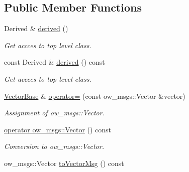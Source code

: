 \subsection*{Public Member Functions}
\begin{DoxyCompactItemize}
\item 
Derived \& \hyperlink{classow__core_1_1VectorBase_ad77f0fccda2286e10ea0035300116d71}{derived} ()\hypertarget{classow__core_1_1VectorBase_ad77f0fccda2286e10ea0035300116d71}{}\label{classow__core_1_1VectorBase_ad77f0fccda2286e10ea0035300116d71}

\begin{DoxyCompactList}\small\item\em Get accces to top level class. \end{DoxyCompactList}\item 
const Derived \& \hyperlink{classow__core_1_1VectorBase_a352daea123987c79b1f7e359598c91cc}{derived} () const \hypertarget{classow__core_1_1VectorBase_a352daea123987c79b1f7e359598c91cc}{}\label{classow__core_1_1VectorBase_a352daea123987c79b1f7e359598c91cc}

\begin{DoxyCompactList}\small\item\em Get accces to top level class. \end{DoxyCompactList}\item 
\hyperlink{classow__core_1_1VectorBase}{Vector\+Base} \& \hyperlink{classow__core_1_1VectorBase_a066502897db21632c31dea62676b2b7a}{operator=} (const ow\+\_\+msgs\+::\+Vector \&vector)\hypertarget{classow__core_1_1VectorBase_a066502897db21632c31dea62676b2b7a}{}\label{classow__core_1_1VectorBase_a066502897db21632c31dea62676b2b7a}

\begin{DoxyCompactList}\small\item\em Assignment of ow\+\_\+msgs\+::\+Vector. \end{DoxyCompactList}\item 
\hyperlink{classow__core_1_1VectorBase_a133eeeb7e00cf5d1b3ffa0f16a5e40ad}{operator ow\+\_\+msgs\+::\+Vector} () const \hypertarget{classow__core_1_1VectorBase_a133eeeb7e00cf5d1b3ffa0f16a5e40ad}{}\label{classow__core_1_1VectorBase_a133eeeb7e00cf5d1b3ffa0f16a5e40ad}

\begin{DoxyCompactList}\small\item\em Conversion to ow\+\_\+msgs\+::\+Vector. \end{DoxyCompactList}\item 
ow\+\_\+msgs\+::\+Vector \hyperlink{classow__core_1_1VectorBase_a97f37653e1b61d0b18c85e9d98e6ed34}{to\+Vector\+Msg} () const \hypertarget{classow__core_1_1VectorBase_a97f37653e1b61d0b18c85e9d98e6ed34}{}\label{classow__core_1_1VectorBase_a97f37653e1b61d0b18c85e9d98e6ed34}


\end{DoxyCompactItemize}
